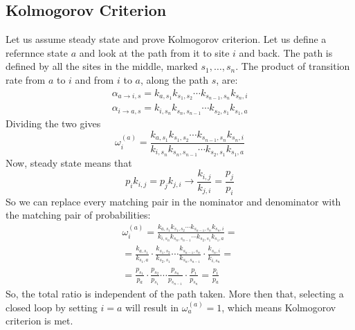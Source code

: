 \documentclass{article}
\begin{document}
\subsection{Kolmogorov Criterion}
Let us assume steady state and prove Kolmogorov criterion. Let us define a refernnce state $a$ and look at the path from it to site $i$ and back. The path is defined by all the sites in the middle, marked $s_1, \dots, s_n$.
The product of transition rate from $a$ to $i$ and from $i$ to $a$, along the path $s$, are:
\begin{equation}
\begin{gathered}
    \alpha_{a\rightarrow i, s} = k_{a, s_1} k_{s_1, s_2}\cdots k_{s_{n-1},s_n} k_{s_n, i} \\
    \alpha_{i\rightarrow a, s} = k_{i, s_n} k_{s_n, s_{n - 1}}\cdots k_{s_2,s_1} k_{s_1, a}
\end{gathered}
\end{equation}
Dividing the two gives
\begin{equation}
    \omega_i^{(a)} = \frac{k_{a, s_1} k_{s_1, s_2}\cdots k_{s_{n-1},s_n} k_{s_n, i}}{k_{i, s_n} k_{s_n, s_{n - 1}}\cdots k_{s_2,s_1} k_{s_1, a}}
\end{equation}
Now, steady state means that
\begin{equation}
    p_i k_{i,j} = p_j k_{j, i} \rightarrow \frac{k_{i,j}}{k_{j,i}} = \frac{p_j}{p_i}
\end{equation}
So we can replace every matching pair in the nominator and denominator with the matching pair of probabilities:
\begin{equation}
\begin{gathered}
    \omega_i^{(a)} = \frac{k_{a, s_1} k_{s_1, s_2}\cdots k_{s_{n-1},s_n} k_{s_n, i}}{k_{i, s_n} k_{s_n, s_{n - 1}}\cdots k_{s_2,s_1} k_{s_1, a}} = \\ =
    \frac{k_{a, s_1}}{k_{s_1, a}}\cdot\frac{k_{s_1, s_2}}{k_{s_2, s_1}}\cdots\frac{k_{s_{n-1}, s_n}}{k_{s_n, s_{n-1}}}\cdot\frac{k_{s_n, i}}{k_{i, s_n}} = \\ =
    \frac{p_{s_1}}{p_a}\cdot\frac{p_{s_2}}{p_{s_1}}\cdots\frac{p_{s_n}}{p_{s_{n-1}}}\cdot\frac{p_{i}}{p_{s_n}} = \frac{p_i}{p_a}
\end{gathered}
\end{equation}
So, the total ratio is independent of the path taken.
More then that, selecting a closed loop by setting $i = a$ will result in $\omega_a^{(a)} = 1$, which means Kolmogorov criterion is met.
\end{document}
